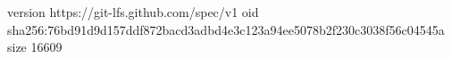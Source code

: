 version https://git-lfs.github.com/spec/v1
oid sha256:76bd91d9d157ddf872bacd3adbd4e3c123a94ee5078b2f230c3038f56c04545a
size 16609
